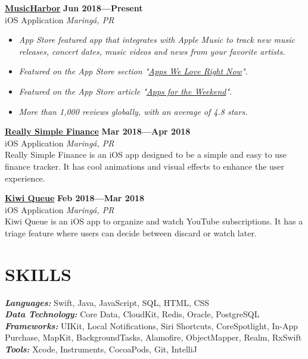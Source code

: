\documentclass[line,margin]{res}
\begin{document}
\begin{resume}
  {\bf \href{https://apps.apple.com/us/app/musicharbor/id1440405750}{MusicHarbor}} \hfill {\bf Jun 2018---Present} \\
  iOS Application \hfill {\sl Maring\'a, PR}\\[-6pt]
    \begin{itemize}
    \item {\sl App Store featured app that integrates with Apple Music to track new music releases, concert dates, music videos and news from your favorite artists.}
    \item {\sl Featured on the App Store section "\href{https://github.com/marcosatanaka/resume-latex/blob/master/images/apps_we_love_right_now.png?raw=true}{Apps We Love Right Now}".}
    \item {\sl Featured on the App Store article "\href{https://apps.apple.com/us/story/id1516537723}{Apps for the Weekend}".}
    \item {\sl More than 1,000 reviews globally, with an average of 4.8 stars.}
    \end{itemize}

  {\bf \href{https://itunes.apple.com/us/app/really-simple-finance/id1370859710}{Really Simple Finance}} \hfill {\bf Mar 2018---Apr 2018} \\
  iOS Application \hfill {\sl Maring\'a, PR}\\[6pt]
  Really Simple Finance is an iOS app designed to be a simple and easy to use finance tracker.
  It has cool animations and visual effects to enhance the user experience.

  {\bf \href{https://itunes.apple.com/us/app/kiwi-queue/id1352747116}{Kiwi Queue}} \hfill {\bf Feb 2018---Mar 2018} \\
  iOS Application \hfill {\sl Maring\'a, PR}\\[6pt]
  Kiwi Queue is an iOS app to organize and watch YouTube subscriptions.
  It has a triage feature where users can decide between discard or watch later.


\section{SKILLS}
  {\sl {\bf Languages:}} Swift, Java, JavaScript, SQL, HTML, CSS \\
  {\sl {\bf Data Technology:}} Core Data, CloudKit, Redis, Oracle, PostgreSQL \\
  {\sl {\bf Frameworks:}} UIKit, Local Notifications, Siri Shortcuts, CoreSpotlight, In-App Purchase, MapKit, BackgroundTasks, Alamofire, ObjectMapper, Realm, RxSwift \\
  {\sl {\bf Tools:}} Xcode, Instruments, CocoaPods, Git, IntelliJ



\end{resume}
\end{document}
